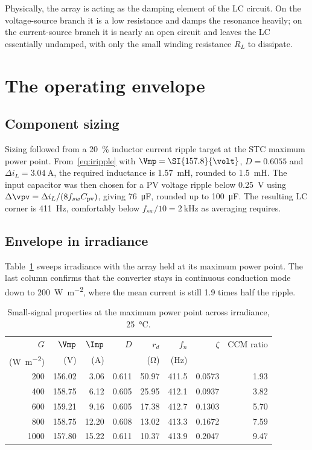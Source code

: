 Physically, the array is acting as the damping element of the LC circuit. On the
voltage-source branch it is a low resistance and damps the resonance heavily; on
the current-source branch it is nearly an open circuit and leaves the LC
essentially undamped, with only the small winding resistance $R_L$ to dissipate.

\section{The operating envelope}
\label{sec:sizing}

\subsection{Component sizing}

Sizing followed from a \SI{20}{\percent} inductor current ripple target at the
STC maximum power point. From~\eqref{eq:iripple} with $\Vmp = \SI{157.8}{\volt}$,
$D = \num{0.6055}$ and $\Delta i_L = \SI{3.04}{\ampere}$, the required inductance
is \SI{1.57}{\milli\henry}, rounded to \SI{1.5}{\milli\henry}. The input
capacitor was then chosen for a PV voltage ripple below \SI{0.25}{\volt} using
$\Delta \vpv = \Delta i_L / (8 f_{sw} C_{\mathrm{pv}})$, giving
\SI{76}{\micro\farad}, rounded up to \SI{100}{\micro\farad}. The resulting LC
corner is \SI{411}{\hertz}, comfortably below $f_{sw}/10 = \SI{2}{\kilo\hertz}$
as averaging requires.

\subsection{Envelope in irradiance}

Table~\ref{tab:envG} sweeps irradiance with the array held at its maximum power
point. The last column confirms that the converter stays in continuous
conduction mode down to \SI{200}{\watt\per\square\metre}, where the mean current
is still \num{1.9} times half the ripple.

\begin{table}[htbp]
\centering
\caption{Small-signal properties at the maximum power point across irradiance, \SI{25}{\celsius}.}
\label{tab:envG}
\begin{tabular}{@{}rrrrrrrr@{}}
\toprule
$G$ & $\Vmp$ & $\Imp$ & $D$ & $r_d$ & $f_n$ & $\zeta$ & CCM ratio \\
(\si{\watt\per\square\metre}) & (\si{\volt}) & (\si{\ampere}) & & (\si{\ohm}) & (\si{\hertz}) & & \\
\midrule
200  & 156.02 & 3.06  & 0.611 & 50.97 & 411.5 & 0.0573 & 1.93 \\
400  & 158.75 & 6.12  & 0.605 & 25.95 & 412.1 & 0.0937 & 3.82 \\
600  & 159.21 & 9.16  & 0.605 & 17.38 & 412.7 & 0.1303 & 5.70 \\
800  & 158.75 & 12.20 & 0.608 & 13.02 & 413.3 & 0.1672 & 7.59 \\
1000 & 157.80 & 15.22 & 0.611 & 10.37 & 413.9 & 0.2047 & 9.47 \\
\bottomrule
\end{tabular}
\end{table}

